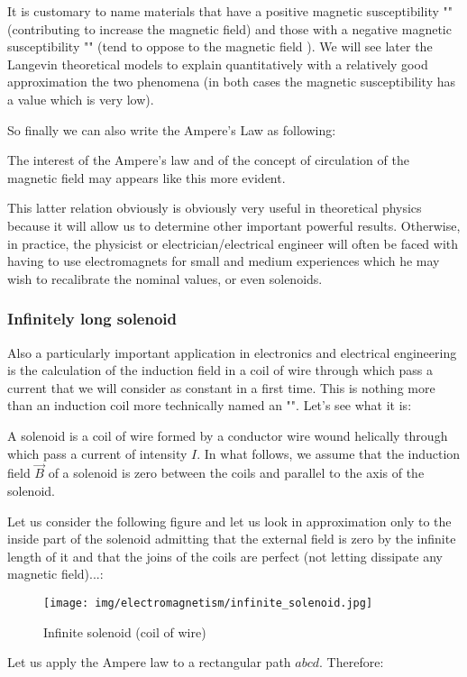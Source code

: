 	It is customary to name materials that have a positive magnetic susceptibility "" (contributing to increase the magnetic field) and those with a negative magnetic susceptibility "" (tend to oppose to the magnetic field ). We will see later the Langevin theoretical models to explain quantitatively with a relatively good approximation the two phenomena (in both cases the magnetic susceptibility has a value which is very low).
	
	So finally we can also write the Ampere's Law as following:
	
	The interest of the Ampere's law and of the concept of circulation of the magnetic field may appears like this more evident.
	
	This latter relation obviously is obviously very useful in theoretical physics because it will allow us to determine other important powerful results. Otherwise, in practice, the physicist or electrician/electrical engineer will often be faced with having to use electromagnets for small and medium experiences which he may wish to recalibrate the nominal values, or even solenoids.
	
	
	\subsubsection{Infinitely long solenoid }
	Also a particularly important application in electronics and electrical engineering is the calculation of the induction field in a coil of wire through which pass a current that we will consider as constant in a first time. This is nothing more than an induction coil more technically named an "". Let's see what it is:
	
	A solenoid is a coil of wire formed by a conductor wire wound helically through which pass a current of intensity $I$. In what follows, we assume that the induction field $\vec{B}$ of a solenoid is zero between the coils and parallel to the axis of the solenoid.
	
	Let us consider the following figure and let us look in approximation only to the inside part of the solenoid admitting that the external field is zero by the infinite length of it and that the joins of the coils are perfect (not letting dissipate any magnetic field)...:
	
	\begin{figure}[H]
		\centering
		\texttt{[image: img/electromagnetism/infinite\_solenoid.jpg]}
		\caption{Infinite solenoid (coil of wire)}
	\end{figure}
	Let us apply the Ampere law to a rectangular path $abcd$. Therefore:
	
